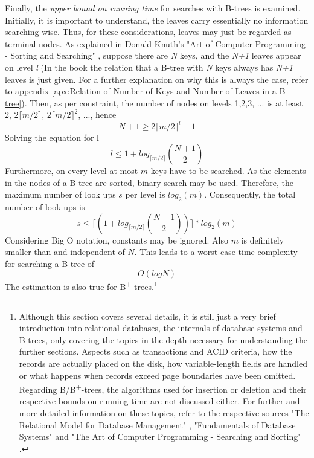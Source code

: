 Finally, the \emph{upper bound on running time} for searches with B-trees is examined. Initially, it is important to understand, the leaves carry essentially no information searching wise. Thus, for these considerations, leaves may just be regarded as terminal nodes. As explained in Donald Knuth's "Art of Computer Programming - Sorting and Searching" \cite{SortingSearchingBible}, suppose there are \emph{N} keys, and the \emph{N+1} leaves appear on level \emph{l} (In the book the relation that a B-tree with \emph{N} keys always has \emph{N+1} leaves is just given. For a further explanation on why this is always the case, refer to appendix \ref{apx:Relation of Number of Keys and Number of Leaves in a B-tree}). Then, as per constraint, the number of nodes on levels 1,2,3, ... is at least $2$, $2 \lceil m/2 \rceil$, $2 \lceil m/2 \rceil ^2$, ..., hence
$$ N + 1 \geq 2 \lceil m/2 \rceil ^l-1 $$
Solving the equation for l
$$ l \leq 1 + log_{\lceil m/2 \rceil}(\frac{N + 1}{2}) $$
Furthermore, on every level at most $m$ keys have to be searched. As the elements in the nodes of a B-tree are sorted, binary search may be used. Therefore, the maximum number of look ups $s$ per level is $log_2(m)$. Consequently, the total number of look ups is 
$$ s \leq \lceil (1 + log_{\lceil m/2 \rceil}(\frac{N + 1}{2})) \rceil * log_2(m) $$ 
Considering Big O notation, constants may be ignored. Also $m$ is definitely smaller than and independent of $N$. This leads to a worst case time complexity for searching a B-tree of 
$$ O(log N) $$ 
The estimation is also true for B\textsuperscript{+}-trees.\footnote{Although this section covers several details, it is still just a very brief introduction into relational databases, the internals of database systems and B-trees, only covering the topics in the depth necessary for understanding the further sections. Aspects such as transactions and ACID criteria, how the records are actually placed on the disk, how variable-length fields are handled or what happens when records exceed page boundaries have been omitted. Regarding B/B\textsuperscript{+}-trees, the algorithms used for insertion or deletion and their respective bounds on running time are not discussed either. For further and more detailed information on these topics, refer to the respective sources "The Relational Model for Database Management" \cite{RelationalDatabaseModel}, "Fundamentals of Database Systems" \cite{DatabaseFundamentals} and "The Art of Computer Programming - Searching and Sorting" \cite{SortingSearchingBible}.}

